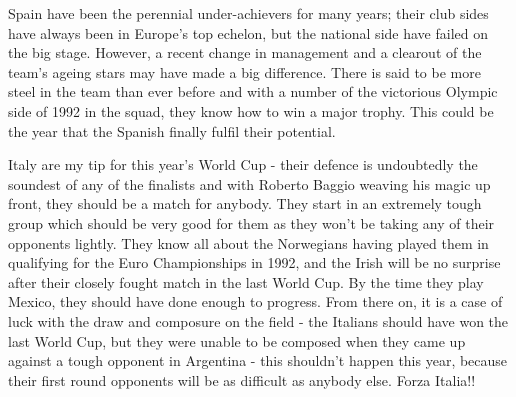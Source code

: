 Spain have been the perennial under-achievers for many years; their club sides
have always been in Europe's top echelon, but the national side have failed on
the big stage. However, a recent change in management and a clearout of the 
team's ageing stars may have made a big difference. There is said to be more 
steel in the team than ever before and with a number of the victorious Olympic
side of 1992 in the squad, they know how to win a major trophy. This could be
the year that the Spanish finally fulfil their potential.

Italy are my tip for this year's World Cup - their defence is undoubtedly the 
soundest of any of the finalists and with Roberto Baggio weaving his magic up
front, they should be a match for anybody. They start in an extremely tough
group which should be very good for them as they won't be taking any of their
opponents lightly. They know all about the Norwegians having played them in 
qualifying for the Euro Championships in 1992, and the Irish will be no 
surprise after their closely fought match in the last World Cup. By the time 
they play Mexico, they should have done enough to progress. From there on, it
is a case of luck with the draw and composure on the field - the Italians 
should have won the last World Cup, but they were unable to be composed when
they came up against a tough opponent in Argentina - this shouldn't happen
this year, because their first round opponents will be as difficult as anybody
else. Forza Italia!!
